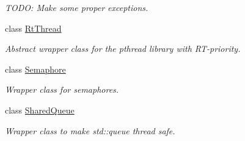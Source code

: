 \begin{DoxyCompactItemize}
\begin{DoxyCompactList}\small\item\em \-T\-O\-D\-O\-: \-Make some proper exceptions. \end{DoxyCompactList}\item 
class \hyperlink{class_u_s_u_1_1_rt_thread}{\-Rt\-Thread}
\begin{DoxyCompactList}\small\item\em \-Abstract wrapper class for the pthread library with \-R\-T-\/priority. \end{DoxyCompactList}\item 
class \hyperlink{class_u_s_u_1_1_semaphore}{\-Semaphore}
\begin{DoxyCompactList}\small\item\em \-Wrapper class for semaphores. \end{DoxyCompactList}\item 
class \hyperlink{class_u_s_u_1_1_shared_queue}{\-Shared\-Queue}
\begin{DoxyCompactList}\small\item\em \-Wrapper class to make std\-::queue thread safe. \end{DoxyCompactList}\end{DoxyCompactItemize}
